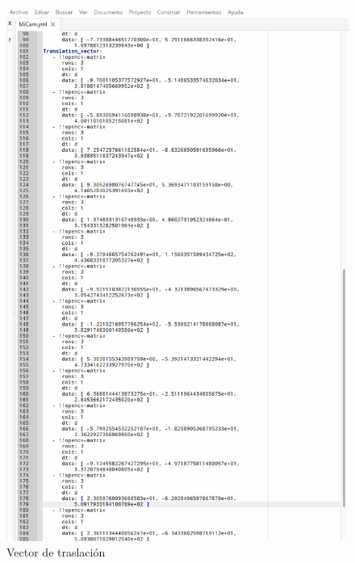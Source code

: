 \begin{itemize}
\begin{itemize}
    \begin{figure}
    \centering
    \includegraphics[scale = 0.35]{capitulo_04/figuras_dir/par2.jpg}
    \caption{Vector de traslación}
    \end{figure}
    

\end{itemize}
\end{itemize}
